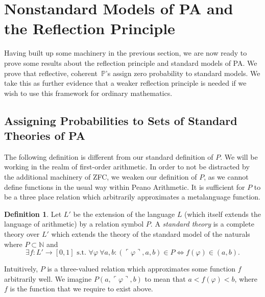 \documentclass[12pt]{article}
\newcommand{\PP}{\mathbb{P}}
\newcommand{\vp}{\varphi}
\theoremstyle{plain}
\theoremstyle{definition}
\newtheorem{definition}[theorem]{Definition}
\theoremstyle{remark}
\begin{document}
\section{Nonstandard Models of PA and the Reflection Principle}
\label{nonstandard-models}
Having built up some machinery in the previous section, we are now ready to prove some results about the reflection principle and standard models of PA. We prove that reflective, coherent~$\PP$'s  assign zero probability to standard models. We take this as further evidence that a weaker reflection principle is needed if we wish to use this framework for ordinary mathematics.
\subsection{Assigning Probabilities to Sets of Standard Theories of PA}
The following definition is different from our standard definition of $P$. 
We will be working in the realm of first-order arithmetic.
In order to not be distracted by the additional machinery of ZFC, we weaken our definition of $P$, as we cannot define functions in the usual way within Peano Arithmetic.
It is sufficient for $P$ to be a three place relation which arbitrarily approximates a metalanguage function.
\begin{definition}
Let $L'$ be the extension of the language $L$ (which itself extends the language of arithmetic) by a relation symbol $P$.
A \emph{standard theory} is a complete theory over $L'$ which extends the theory of the standard model of the naturals where $P\subset\mathbb{N}$ and 
$$\exists f : L'\rightarrow[0, 1] \text{ s.t. } \forall \vp~\forall a, b: (\ulcorner \vp \urcorner, a, b) \in P \iff f(\vp) \in (a, b).$$
\end{definition}
Intuitively, $P$ is a three-valued relation which approximates some function $f$ arbitrarily well. We imagine $P( a,\ulcorner\varphi\urcorner, b)$ to mean that $a<f(\varphi)<b$, where $f$ is the function that we require to exist above.
\end{document}
